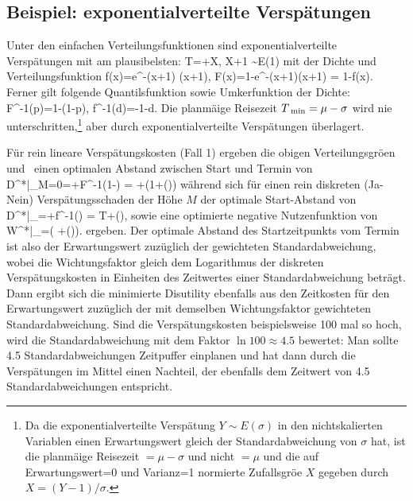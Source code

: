 \subsection{Beispiel: exponentialverteilte Versp\"atungen}
Unter den einfachen Verteilungsfunktionen sind exponentialverteilte
Versp\"atungen mit am plausibelsten:
\bdm
T=\mu+\sigma X, \quad X+1 \sim E(1)
\edm
mit der Dichte und Verteilungsfunktion
\be
\label{fF-exp}
f(x)=e^{-(x+1)} \theta(x+1), \quad
F(x)=1-e^{-(x+1)}\theta(x+1) = 1-f(x).
\ee
Ferner gilt folgende Quantilsfunktion sowie Umkerfunktion der Dichte:
\be
\label{inv-exp}
F^{-1}(p)=1-\ln(1-p), \quad f^{-1}(d)=-1-\ln d.
\ee
Die planm\"a\3ige Reisezeit $T_{{\mbox{ {\scriptsize \hspace{-0.2ex}min}}}}=\mu-\sigma$ wird nie
unterschritten,\footnote{Da die exponentialverteilte Versp\"atung
  $Y\sim E(\sigma)$ in den nichtskalierten Variablen einen
  Erwartungswert gleich der Standardabweichung von $\sigma$ hat, ist
  die planm\"a\3ige Reisezeit $=\mu-\sigma$ und nicht $=\mu$ und die
  auf Erwartungswert=0 und Varianz=1 normierte Zufallsgr\"o\3e $X$ gegeben
  durch $X=(Y-1)/\sigma$.} aber durch exponentialverteilte
Versp\"atungen \"uberlagert. 

F\"ur rein lineare Versp\"atungskosten (Fall 1) ergeben die obigen
Verteilungsgr\"o\3en~ und~
einen optimalen Abstand zwischen Start und Termin von 
\bdm
D^*|_{M=0}=\mu+\sigma F^{-1}\left(1-\frac{\lambda}{\nu}\right)
 = \mu+\sigma\left(1+\ln\left(\frac{\nu}{\lambda}\right)\right)
\edm
w\"ahrend sich f\"ur einen rein diskreten (Ja-Nein)
Versp\"atungsschaden der H\"ohe $M$ der optimale Start-Abstand von 
\bdm
D^*|_{}=\mu+\sigma f^{-1}\left(\right)
 = T+\sigma \ln \left(\right),
\edm
sowie  eine optimierte negative Nutzenfunktion von
\bdm
W^*|_{}=\lambda\left( \mu
 +\sigma \ln \left(\right)\right).
\edm
ergeben. Der optimale Abstand des Startzeitpunkts vom Termin ist also
der Erwartungswert zuz\"uglich der gewichteten Standardabweichung,
wobei die Wichtungsfaktor gleich dem Logarithmus der diskreten
Versp\"atungskosten  
in Einheiten des Zeitwertes einer Standardabweichung betr\"agt. Dann
ergibt sich die minimierte Disutility ebenfalls aus den Zeitkosten
f\"ur den Erwartungswert zuz\"uglich der mit demselben Wichtungsfaktor gewichteten
Standardabweichung. Sind die
Versp\"atungskosten beispielsweise 100 mal so hoch, wird die
Standardabweichung mit dem Faktor $\ln 100 \approx 4.5$ bewertet: Man
sollte 4.5 Standardabweichungen Zeitpuffer einplanen und hat dann
durch die Versp\"atungen im Mittel einen Nachteil, der ebenfalls dem
Zeitwert von 4.5 Standardabweichungen entspricht.

